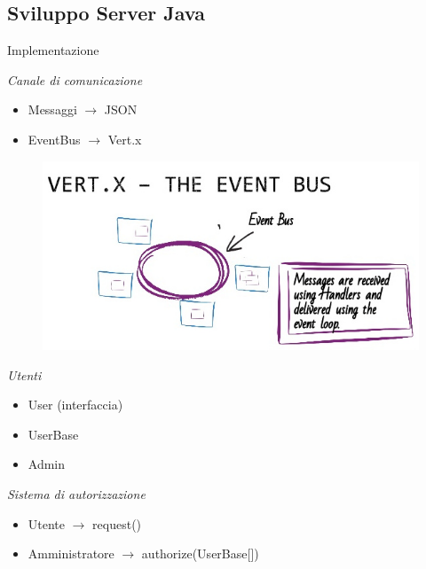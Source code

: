 	\subsection{Sviluppo Server Java}
		\begin{frame}{Implementazione}
			\begin{minipage}{0.4\textwidth}
				\emph{Canale di comunicazione}
					\begin{itemize}
						\item Messaggi $\rightarrow$ JSON
						\item EventBus $\rightarrow$ Vert.x
					\end{itemize}
			\end{minipage}
			\begin{minipage}{0.4\textwidth}
				\begin{figure}
					\includegraphics[width=1.6\textwidth]{capitolo_3/immagini/eventbus.jpg}
				\end{figure}
			\end{minipage}
			\begin{minipage}{0.3\textwidth}
				\emph{Utenti}
					\begin{itemize}
						\item User (interfaccia)
						\item UserBase
						\item Admin
					\end{itemize}
			\end{minipage}
			\begin{minipage}{0.5\textwidth}
				\emph{Sistema di autorizzazione}
				\begin{itemize}
					\item Utente $\rightarrow$ request()
					\item Amministratore $\rightarrow$ authorize(UserBase[])
				\end{itemize}
			\end{minipage}
		\end{frame}
